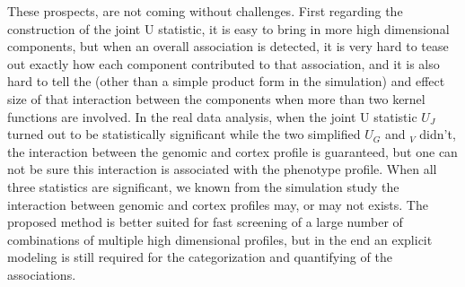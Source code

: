 These prospects, are not coming without challenges. First regarding the construction of the joint U statistic, it is easy to bring in more high dimensional components, but when an overall association is detected, it is very hard to tease out exactly how each component contributed to that association, and it is also hard to tell the  (other than a simple product form in the simulation) and effect size of that interaction between the components when more than two kernel functions are involved. In the real data analysis, when the joint U statistic $U_J$ turned out to be statistically significant while the two simplified $U_G$ and $_V$ didn't, the interaction between the genomic and cortex profile is guaranteed, but one can not be sure this interaction is associated with the phenotype profile. When all three statistics are significant, we known from the simulation study the interaction between genomic and cortex profiles may, or may not exists. The proposed method is better suited for fast screening of a large number of combinations of multiple high dimensional profiles, but in the end an explicit modeling is still required for the categorization and quantifying of the associations.

